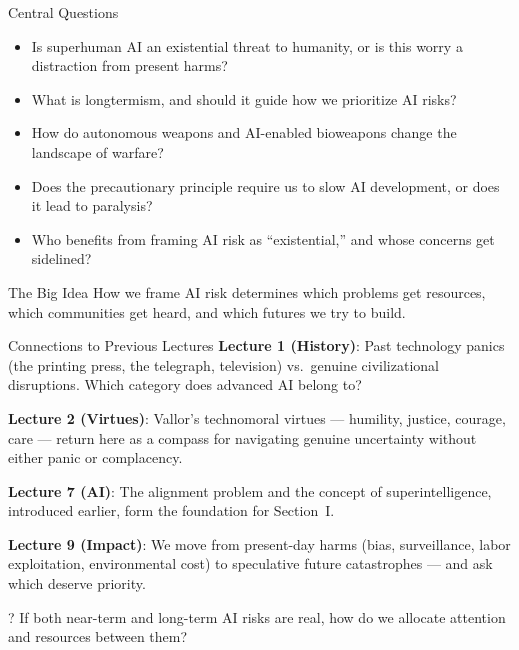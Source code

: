 \documentclass[aspectratio=169,11pt]{beamer}
\begin{document}
\begin{frame}{Central Questions}
\begin{itemize}
    \item Is superhuman AI an existential threat to humanity, or is this worry a distraction from present harms?
    \item What is longtermism, and should it guide how we prioritize AI risks?
    \item How do autonomous weapons and AI-enabled bioweapons change the landscape of warfare?
    \item Does the precautionary principle require us to slow AI development, or does it lead to paralysis?
    \item Who benefits from framing AI risk as ``existential,'' and whose concerns get sidelined?
\end{itemize}

\vspace{0.2cm}
\begin{alertblock}{The Big Idea}
How we frame AI risk determines which problems get resources, which communities get heard, and which futures we try to build.
\end{alertblock}
\end{frame}

\begin{frame}[shrink=4]{Connections to Previous Lectures}
\textbf{Lecture 1 (History)}: Past technology panics (the printing press, the telegraph, television) vs.\ genuine civilizational disruptions. Which category does advanced AI belong to?

\vspace{0.2cm}
\textbf{Lecture 2 (Virtues)}: Vallor's technomoral virtues --- humility, justice, courage, care --- return here as a compass for navigating genuine uncertainty without either panic or complacency.

\vspace{0.2cm}
\textbf{Lecture 7 (AI)}: The alignment problem and the concept of superintelligence, introduced earlier, form the foundation for Section~I.

\vspace{0.2cm}
\textbf{Lecture 9 (Impact)}: We move from present-day harms (bias, surveillance, labor exploitation, environmental cost) to speculative future catastrophes --- and ask which deserve priority.

\begin{alertblock}{?}
If both near-term and long-term AI risks are real, how do we allocate attention and resources between them?
\end{alertblock}
\end{frame}
\end{document}
